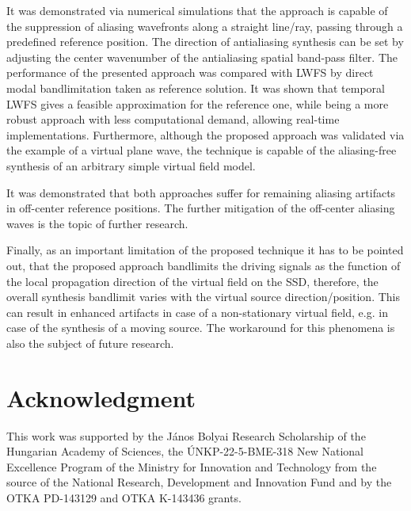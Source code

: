 \documentclass[conference]{IEEEtran}
\begin{document}
It was demonstrated via numerical simulations that the approach is capable of the suppression of aliasing wavefronts along a straight line/ray, passing through a predefined reference position.
The direction of antialiasing synthesis can be set by adjusting the center wavenumber of the antialiasing spatial band-pass filter.
The performance of the presented approach was compared with LWFS by direct modal bandlimitation taken as reference solution.
It was shown that temporal LWFS gives a feasible approximation for the reference one, while being a more robust approach with less computational demand, allowing real-time implementations. 
Furthermore, although the proposed approach was validated via the example of a virtual plane wave, the technique is capable of the aliasing-free synthesis of an arbitrary simple virtual field model.

It was demonstrated that both approaches suffer for remaining aliasing artifacts in off-center reference positions. 
The further mitigation of the off-center aliasing waves is the topic of further research.

Finally, as an important limitation of the proposed technique it has to be pointed out, that the proposed approach bandlimits the driving signals as the function of the local propagation direction of the virtual field on the SSD, therefore, the overall synthesis bandlimit varies with the virtual source direction/position.
This can result in enhanced artifacts in case of a non-stationary virtual field, e.g. in case of the synthesis of a moving source.
The workaround for this phenomena is also the subject of future research.

\section*{Acknowledgment}

This work was supported by the János Bolyai Research Scholarship of the Hungarian Academy of Sciences, the ÚNKP-22-5-BME-318 New National Excellence Program of the Ministry for Innovation and Technology from the source of the National Research, Development and Innovation Fund
and by the OTKA PD-143129 and OTKA K-143436 grants.



\vspace{12pt}
\end{document}
